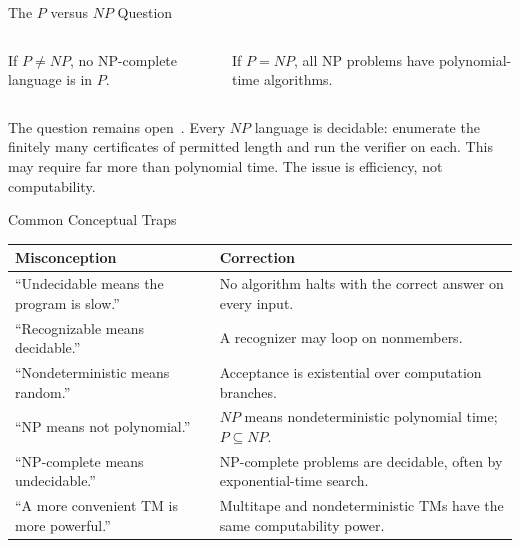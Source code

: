 \documentclass[10pt]{beamer}
\begin{document}
\begin{frame}{The $P$ versus $NP$ Question}
  \small
  \begin{columns}[T]
    \centering

    If $P\ne NP$, no NP-complete language is in $P$.

    \centering

    If $P=NP$, all NP problems have polynomial-time algorithms.
  \end{columns}
  \vspace{0.2cm}
  The question remains open~\cite{clay-pnp}. Every $NP$ language is decidable:
  enumerate the finitely many certificates of permitted length and run the
  verifier on each. This may require far more than polynomial time.
  The issue is efficiency, not computability.
\end{frame}

\begin{frame}{Common Conceptual Traps}
  \small
  \begin{center}
  \begin{tabular}{L{4.4cm}L{6.0cm}}
    \toprule
    Misconception & Correction \\
    \midrule
    ``Undecidable means the program is slow.'' & No algorithm halts with the correct answer on every input. \\
    ``Recognizable means decidable.'' & A recognizer may loop on nonmembers. \\
    ``Nondeterministic means random.'' & Acceptance is existential over computation branches. \\
    ``NP means not polynomial.'' & $NP$ means nondeterministic polynomial time; $P\subseteq NP$. \\
    ``NP-complete means undecidable.'' & NP-complete problems are decidable, often by exponential-time search. \\
    ``A more convenient TM is more powerful.'' & Multitape and nondeterministic TMs have the same computability power. \\
    \bottomrule
  \end{tabular}
  \end{center}
\end{frame}
\end{document}
